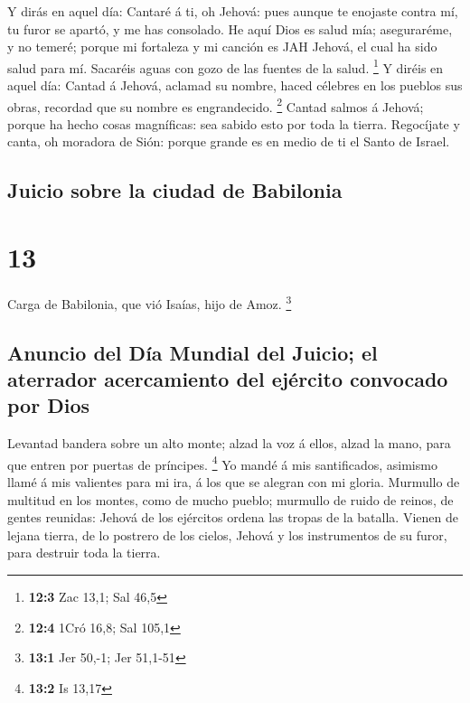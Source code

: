  Y dirás en aquel día: Cantaré á ti, oh Jehová: pues
aunque te enojaste contra mí, tu furor se apartó, y me has consolado.
 He aquí Dios es salud mía; aseguraréme, y no temeré;
porque mi fortaleza y mi canción es JAH Jehová, el cual ha sido salud
para mí.  Sacaréis aguas con gozo de las fuentes de la
salud. \footnote{\textbf{12:3} Zac 13,1; Sal 46,5}  Y
diréis en aquel día: Cantad á Jehová, aclamad su nombre, haced célebres
en los pueblos sus obras, recordad que su nombre es engrandecido.
\footnote{\textbf{12:4} 1Cró 16,8; Sal 105,1}  Cantad
salmos á Jehová; porque ha hecho cosas magníficas: sea sabido esto por
toda la tierra.  Regocíjate y canta, oh moradora de Sión:
porque grande es en medio de ti el Santo de Israel.

\hypertarget{juicio-sobre-la-ciudad-de-babilonia}{%
\subsection{Juicio sobre la ciudad de
Babilonia}\label{juicio-sobre-la-ciudad-de-babilonia}}

\hypertarget{section-12}{%
\section{13}\label{section-12}}

 Carga de Babilonia, que vió Isaías, hijo de Amoz.
\footnote{\textbf{13:1} Jer 50,-1; Jer 51,1-51}

\hypertarget{anuncio-del-duxeda-mundial-del-juicio-el-aterrador-acercamiento-del-ejuxe9rcito-convocado-por-dios}{%
\subsection{Anuncio del Día Mundial del Juicio; el aterrador
acercamiento del ejército convocado por
Dios}\label{anuncio-del-duxeda-mundial-del-juicio-el-aterrador-acercamiento-del-ejuxe9rcito-convocado-por-dios}}

 Levantad bandera sobre un alto monte; alzad la voz á
ellos, alzad la mano, para que entren por puertas de príncipes.
\footnote{\textbf{13:2} Is 13,17}  Yo mandé á mis
santificados, asimismo llamé á mis valientes para mi ira, á los que se
alegran con mi gloria.  Murmullo de multitud en los
montes, como de mucho pueblo; murmullo de ruido de reinos, de gentes
reunidas: Jehová de los ejércitos ordena las tropas de la batalla.
 Vienen de lejana tierra, de lo postrero de los cielos,
Jehová y los instrumentos de su furor, para destruir toda la tierra.


